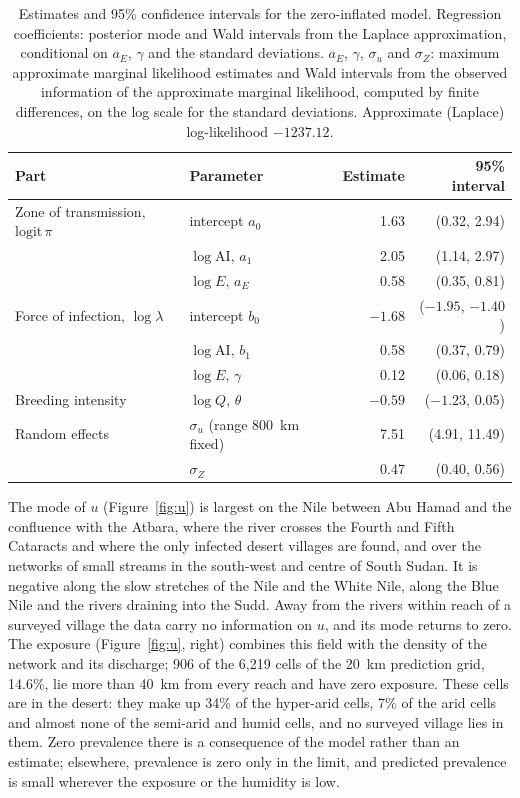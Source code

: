 \documentclass[11pt,a4paper]{article}
\newcommand{\AI}{\mathrm{AI}}
\begin{document}
\begin{table}[H]
\centering
\caption{Estimates and 95\% confidence intervals for the zero-inflated model. Regression coefficients: posterior mode and Wald intervals from the Laplace approximation, conditional on $a_E$, $\gamma$ and the standard deviations. $a_E$, $\gamma$, $\sigma_u$ and $\sigma_Z$: maximum approximate marginal likelihood estimates and Wald intervals from the observed information of the approximate marginal likelihood, computed by finite differences, on the log scale for the standard deviations. Approximate (Laplace) log-likelihood $-1237.12$.}
\label{tab:zil}
\begin{tabular}{llrr}
\toprule
Part & Parameter & Estimate & 95\% interval \\
\midrule
Zone of transmission, $\mathrm{logit}\,\pi$ & intercept $a_0$ & 1.63 & (0.32, 2.94) \\
 & $\log \AI$, $a_1$ & 2.05 & (1.14, 2.97) \\
 & $\log E$, $a_E$ & 0.58 & (0.35, 0.81) \\
Force of infection, $\log\lambda$ & intercept $b_0$ & $-1.68$ & ($-1.95$, $-1.40$) \\
 & $\log \AI$, $b_1$ & 0.58 & (0.37, 0.79) \\
 & $\log E$, $\gamma$ & 0.12 & (0.06, 0.18) \\
Breeding intensity & $\log Q$, $\theta$ & $-0.59$ & ($-1.23$, 0.05) \\
Random effects & $\sigma_u$ (range 800~km fixed) & 7.51 & (4.91, 11.49) \\
 & $\sigma_Z$ & 0.47 & (0.40, 0.56) \\
\bottomrule
\end{tabular}
\end{table}

The mode of $u$ (Figure~\ref{fig:u}) is largest on the Nile between Abu Hamad and the confluence with the Atbara, where the river crosses the Fourth and Fifth Cataracts and where the only infected desert villages are found, and over the networks of small streams in the south-west and centre of South Sudan. It is negative along the slow stretches of the Nile and the White Nile, along the Blue Nile and the rivers draining into the Sudd. Away from the rivers within reach of a surveyed village the data carry no information on $u$, and its mode returns to zero. The exposure (Figure~\ref{fig:u}, right) combines this field with the density of the network and its discharge; 906 of the 6{,}219 cells of the 20~km prediction grid, 14.6\%, lie more than 40~km from every reach and have zero exposure. These cells are in the desert: they make up 34\% of the hyper-arid cells, 7\% of the arid cells and almost none of the semi-arid and humid cells, and no surveyed village lies in them. Zero prevalence there is a consequence of the model rather than an estimate; elsewhere, prevalence is zero only in the limit, and predicted prevalence is small wherever the exposure or the humidity is low.
\end{document}

